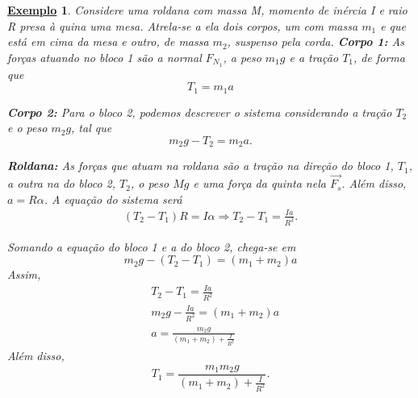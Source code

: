 \documentclass{article}
\newtheorem{example}{\underline{Exemplo}}
\begin{document}
\begin{example}
  Considere uma roldana com massa M, momento de inércia I e raio R presa à quina uma mesa. Atrela-se a ela dois corpos, um com massa \(m_{1}\) e que está em cima da mesa
e outro, de massa \(m_{2}\), suspenso pela corda. 
  \textbf{Corpo 1:}
    As forças atuando no bloco 1 são a normal \(F_{N_{1}}\), a peso \(m_{1}g\) e a tração \(T_{1}\), de forma que 
      \[
        T_{1}=m_{1}a
      \]

  \textbf{Corpo 2:}
    Para o bloco 2, podemos descrever o sistema considerando a tração \(T_{2}\) e o peso \(m_{2}g\), tal que 
      \[
        m_{2}g - T_{2} = m_{2}a.
      \]

  \textbf{Roldana:}
    As forças que atuam na roldana são a tração na direção do bloco 1, \(T_{1}\), a outra na do bloco 2, \(T_{2}\), o peso
  \(Mg\) e uma força da quinta nela \(\vec{F_{s}}\). Além disso, \(a=R\alpha \). A equação do sistema será
 \begin{align*}
   (T_{2}-T_{1})R = I\alpha \Rightarrow  T_{2} - T_{1} = \frac{Ia}{R^{2}}.
 \end{align*}

  Somando a equação do bloco 1 e a do bloco 2, chega-se em 
    \[
      m_{2}g - (T_{2}-T_{1}) = (m_{1}+m_{2})a
    \]
  Assim, 
 \begin{align*}
   &T_{2} - T_{1} = \frac{Ia}{R^{2}}\\
   &m_{2}g - \frac{Ia}{R^{2}} = (m_{1}+m_{2})a\\
   &a = \frac{m_{2}g}{(m_{1}+m_2) + \frac{I}{R^{2}}}
 \end{align*}
 Além disso, 
   \[
     T_{1} = \frac{m_{1}m_{2}g}{(m_{1}+m_{2})+\frac{I}{R^{2}}}.
   \]
\end{example}
\end{document}
